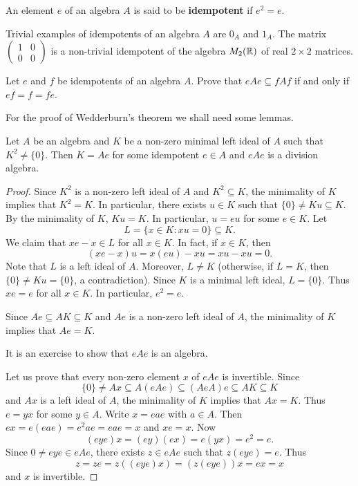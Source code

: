 \begin{definition}
    An element $e$ of an algebra $A$ is said to be 
    \textbf{idempotent} if $e^2=e$. 
\end{definition}

Trivial examples of idempotents of an algebra $A$ 
are $0_A$ and $1_A$. The
matrix 
$\begin{pmatrix}1&0\\0&0\end{pmatrix}$ 
is a non-trivial idempotent of the algebra $M_2(\mathbb{R})$ of real $2\times 2$ matrices. 

\begin{exercise}
    Let $e$ and $f$ be idempotents of an algebra $A$. 
    Prove that $eAe\subseteq fAf$ if and only if $ef=f=fe$.
\end{exercise}

For the proof of Wedderburn's theorem we shall need some lemmas. 

\begin{lemma}[Brauer]
\label{lem:Brauer}
Let $A$ be an algebra and $K$ be a non-zero 
minimal left ideal of $A$ such that $K^2\ne\{0\}$. 
Then $K=Ae$ for some idempotent $e\in A$ and
$eAe$ is a division algebra.
\end{lemma}

\begin{proof}
Since $K^2$ is a non-zero left ideal of $A$ and 
$K^2\subseteq K$, the minimality of $K$ implies that $K^2=K$. In particular, 
there exists $u\in K$ such that $\{0\}\ne Ku\subseteq K$. By the minimality of $K$, 
$Ku=K$. In particular, $u=eu$ for some $e\in K$. 
Let 
\[
L=\{x\in K:xu=0\}\subseteq K.
\] 
We claim that $xe-x\in L$ for all $x\in K$. In fact, 
if $x\in K$, then 
\[
(xe-x)u=x(eu)-xu=xu-xu=0.
\]
Note that $L$ is a left ideal of $A$. Moreover, $L\ne K$ (otherwise, 
if $L=K$, then $\{0\}\ne Ku=\{0\}$, a contradiction). 
Since $K$ is a minimal left ideal, 
$L=\{0\}$. Thus $xe=e$ for all $x\in K$. In particular, $e^2=e$. 

Since $Ae\subseteq AK\subseteq K$ and $Ae$ is a non-zero 
left ideal of $A$, 
the minimality of $K$ implies that $Ae=K$. 

It is an exercise to show that $eAe$ is an algebra. 

Let us prove
that every non-zero element $x$ of $eAe$ is invertible. Since  
\[
\{0\}\ne Ax\subseteq A(eAe)\subseteq (AeA)e\subseteq AK\subseteq K
\]
and $Ax$ is a left ideal of $A$, the minimality of $K$ implies that 
$Ax=K$. Thus $e=yx$ for some $y\in A$. Write $x=eae$ with $a\in A$. Then 
$ex=e(eae)=e^2ae=eae=x$ and 
$xe=x$. Now 
\[
(eye)x=(ey)(ex)=e(yx)=e^2=e.
\]
Since $0\ne eye\in eAe$, there exists $z\in eAe$ such that 
$z(eye)=e$. Thus 
\[
z=ze=z((eye)x)=(z(eye))x=ex=x
\]
and $x$ is invertible. 
\end{proof}

